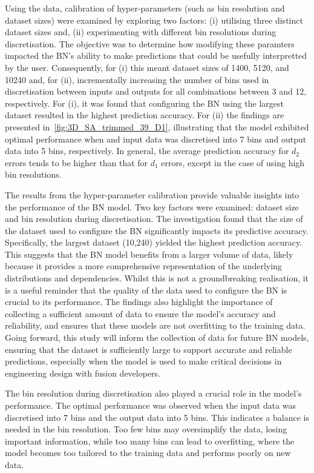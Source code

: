 \documentclass[journal]{IEEEtran}
\begin{document}
Using the data, calibration of hyper-parameters (such as bin resolution and dataset sizes) were examined by exploring two factors: (i) utilising three distinct dataset sizes and, (ii) experimenting with different bin resolutions during discretisation. The objective was to determine how modifying these paramters impacted the BN's ability to make predictions that could be usefully interpretted by the user. Consequently, for (i) this meant dataset sizes of 1400, 5120, and 10240 and, for (ii), incrementally increasing the number of bins used in discretisation between inputs and outputs for all combinations between 3 and 12, respectively. For (i), it was found that configuring the BN using the largest dataset resulted in the highest prediction accuracy. For (ii) the findings are presented in~\ref{fig:3D_SA_trimmed_39_D1}, illustrating that the model exhibited optimal performance when and input data was discretised into 7 bins and output data into 5 bins, respectively. In general, the average prediction accuracy for $d_{2}$ errors tends to be higher than that for $d_{1}$ errors, except in the case of using high bin resolutions.

The results from the hyper-parameter calibration provide valuable insights into the performance of the BN model. Two key factors were examined: dataset size and bin resolution during discretisation. The investigation found that the size of the dataset used to configure the BN significantly impacts its predictive accuracy. Specifically, the largest dataset (10,240) yielded the highest prediction accuracy. This suggests that the BN model benefits from a larger volume of data, likely because it provides a more comprehensive representation of the underlying distributions and dependencies. Whilst this is not a groundbreaking realisation, it is a useful reminder that the quality of the data used to configure the BN is crucial to its performance. The findings also highlight the importance of collecting a sufficient amount of data to ensure the model's accuracy and reliability, and ensures that these models are not overfitting to the training data. Going forward, this study will inform the collection of data for future BN models, ensuring that the dataset is sufficiently large to support accurate and reliable predictions, especially when the model is used to make critical decisions in engineering design with fusion developers.

The bin resolution during discretisation also played a crucial role in the model's performance. The optimal performance was observed when the input data was discretised into 7 bins and the output data into 5 bins. This indicates a balance is needed in the bin resolution. Too few bins may oversimplify the data, losing important information, while too many bins can lead to overfitting, where the model becomes too tailored to the training data and performs poorly on new data.
\end{document}
